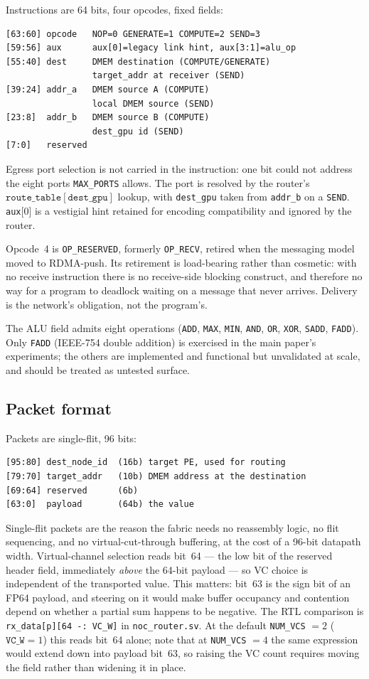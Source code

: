 \documentclass[journal,10pt]{IEEEtran}
\newcommand{\sv}[1]{\texttt{#1}}
\begin{document}
Instructions are 64 bits, four opcodes, fixed fields:

\begin{lstlisting}
[63:60] opcode   NOP=0 GENERATE=1 COMPUTE=2 SEND=3
[59:56] aux      aux[0]=legacy link hint, aux[3:1]=alu_op
[55:40] dest     DMEM destination (COMPUTE/GENERATE)
                 target_addr at receiver (SEND)
[39:24] addr_a   DMEM source A (COMPUTE)
                 local DMEM source (SEND)
[23:8]  addr_b   DMEM source B (COMPUTE)
                 dest_gpu id (SEND)
[7:0]   reserved
\end{lstlisting}

Egress port selection is not carried in the instruction: one bit could not
address the eight ports \sv{MAX\_PORTS} allows. The port is resolved by the
router's $\sv{route\_table}[\sv{dest\_gpu}]$ lookup, with \sv{dest\_gpu} taken
from \sv{addr\_b} on a \texttt{SEND}. \sv{aux}[0] is a vestigial hint retained
for encoding compatibility and ignored by the router.

Opcode~4 is \sv{OP\_RESERVED}, formerly \sv{OP\_RECV}, retired when the
messaging model moved to RDMA-push. Its retirement is load-bearing rather
than cosmetic: with no receive instruction there is no receive-side blocking
construct, and therefore no way for a program to deadlock waiting on a
message that never arrives. Delivery is the network's obligation, not the
program's.

The ALU field admits eight operations (\sv{ADD}, \sv{MAX}, \sv{MIN},
\sv{AND}, \sv{OR}, \sv{XOR}, \sv{SADD}, \sv{FADD}). Only \sv{FADD}
(IEEE-754 double addition) is exercised in the main paper's experiments; the
others are implemented and functional but unvalidated at scale, and should be
treated as untested surface.

\subsection{Packet format}

Packets are single-flit, 96 bits:

\begin{lstlisting}
[95:80] dest_node_id  (16b) target PE, used for routing
[79:70] target_addr   (10b) DMEM address at the destination
[69:64] reserved      (6b)
[63:0]  payload       (64b) the value
\end{lstlisting}

Single-flit packets are the reason the fabric needs no reassembly logic,
no flit sequencing, and no virtual-cut-through buffering, at the cost of a
96-bit datapath width. Virtual-channel selection reads bit~64 --- the
low bit of the reserved header field, immediately \emph{above} the 64-bit
payload --- so VC choice is independent of the transported value. This
matters: bit~63 is the sign bit of an FP64 payload, and steering on it would
make buffer occupancy and contention depend on whether a partial sum happens
to be negative. The RTL comparison is
\sv{rx\_data[p][64 -: VC\_W]} in \sv{noc\_router.sv}. At the default
\sv{NUM\_VCS} $=2$ ($\sv{VC\_W}=1$) this reads bit~64 alone; note that at
\sv{NUM\_VCS} $=4$ the same expression would extend down into payload bit~63,
so raising the VC count requires moving the field rather than widening it in
place.
\end{document}
